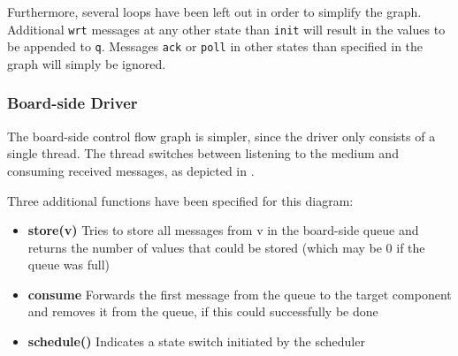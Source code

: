 \documentclass{report}
\begin{document}
Furthermore, several loops have been left out in order to simplify the graph. Additional \texttt{wrt} messages at any other state than \texttt{init} will result in the values to be appended to \texttt{q}. Messages \texttt{ack} or \texttt{poll} in other states than specified in the graph will simply be ignored.
%
%
%
%

\subsubsection{Board-side Driver}
The board-side control flow graph is simpler, since the driver only consists of a single thread. The thread switches between listening to the medium and consuming received messages, as depicted in .

Three additional functions have been specified for this diagram:
\begin{itemize} \itemsep1pt \parskip0pt 
\item \textbf{store(v)} Tries to store all messages from v in the board-side queue and returns the number of values that could be stored (which may be 0 if the queue was full)
\item \textbf{consume} Forwards the first message from the queue to the target component and removes it from the queue, if this could successfully be done
\item \textbf{schedule()} Indicates a state switch initiated by the scheduler 
\end{itemize}
\end{document}
